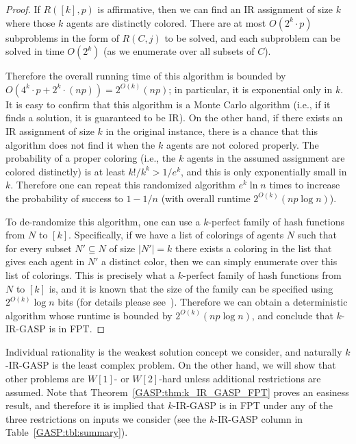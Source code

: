 \begin{proof}
	If $R([k], p)$ is affirmative, then we can find an IR assignment of size $k$ where those $k$ agents are distinctly colored. 
		There are at most $O(2^k \cdot p)$ subproblems in the form of $R(C, j)$ to be solved, and each subproblem can be solved in time $O(2^k)$ (as we enumerate over all subsets of $C$).
		
		Therefore the overall running time of this algorithm is bounded by $O(4^k \cdot p + 2^k \cdot (np)) = 2^{O(k)}(np)$; in particular, it is exponential only in $k$. It is easy to confirm that this algorithm is a Monte Carlo algorithm (i.e., if it finds a solution, it is guaranteed to be IR).  On the other hand, if there exists an IR assignment of size $k$ in the original instance, there is a chance that this algorithm does not find it when the $k$ agents are not colored properly. The probability of a proper coloring (i.e., the $k$ agents in the assumed assignment are colored distinctly) is at least $k!/k^k > 1/e^k$, and this is only exponentially small in $k$. Therefore one can repeat this randomized algorithm $e^k\ln n$ times to increase the probability of success to $1-1/n$ (with overall runtime $2^{O(k)}(np \log n)$).

	To de-randomize this algorithm, one can use a $k$-perfect family of hash functions from $N$ to $[k]$.
	Specifically, if we have a list of colorings of agents $N$ such that for every subset $N' \subseteq N$ of size $|N'| = k$ there exists a coloring in the list that gives each agent in $N'$ a distinct color, then we can simply enumerate over this list of colorings. This is precisely what a $k$-perfect family of hash functions from $N$ to $[k]$ is, and it is known that the size of the family can be specified using $2^{O(k)}\log n$ bits (for details please see~\cite{ColorCoding}). Therefore we can obtain a deterministic algorithm whose runtime is bounded by $2^{O(k)}(np \log n)$, and conclude that $k$-IR-GASP is in FPT. 
\end{proof}

Individual rationality is the weakest solution concept we consider, and naturally $k$-IR-GASP is the least complex problem. On the other hand, we will show that other problems are $W[1]$- or $W[2]$-hard unless additional restrictions are assumed. Note that Theorem~\ref{GASP:thm:k_IR_GASP_FPT} proves an easiness result, and therefore it is implied that $k$-IR-GASP is in FPT under any of the three restrictions on inputs we consider (see the $k$-IR-GASP column in Table~\ref{GASP:tbl:summary}).



